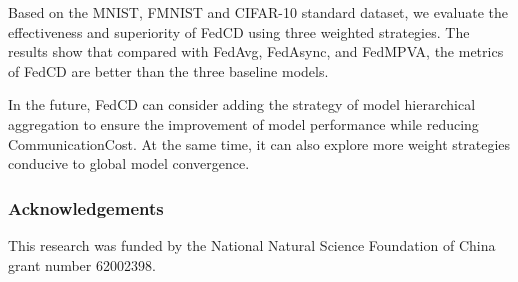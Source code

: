 \documentclass[twoside,twocolumn]{article}
\makeatletter
\def\subparagraph{\@startsection{paragraph}{5}{2\parindent}{0ex plus 0.1ex minus 0.1ex}%
{0ex}{\normalfont\small\itshape}}%
\makeatother
\begin{document}
\begin{spacing}{1.0}
	Based on the MNIST, FMNIST and CIFAR-10 standard dataset, we evaluate the effectiveness and superiority of FedCD using three weighted strategies. The results show that compared with FedAvg, FedAsync, and FedMPVA, the metrics of FedCD are better than the three baseline models.
	
	In the future, FedCD can consider adding the strategy of model hierarchical aggregation to ensure the improvement of model performance while reducing CommunicationCost. At the same time, it can also explore more weight strategies conducive to global model convergence.

\subsubsection{Acknowledgements} This research was funded by the National Natural Science Foundation of China grant number 62002398.









  

\end{spacing}
\end{document}
